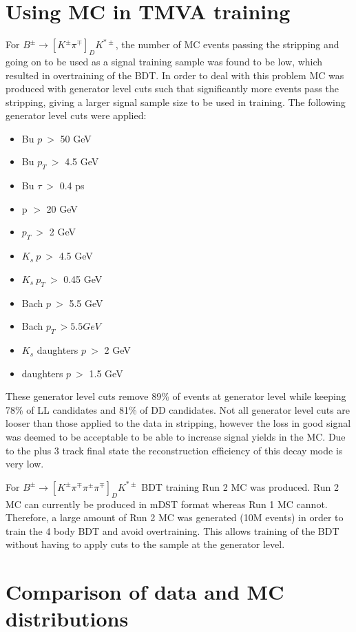 \section{Using MC in TMVA training}
\label{sec:mc:tmva}

For $B^{\pm} \to [K^{\pm}\pi^{\mp}]_D K^{*\pm}$, the number of MC events passing the stripping and going on to be used as a signal training sample was found to be low, which resulted in overtraining of the BDT. In order to deal with this problem MC was produced with generator level cuts such that significantly more events pass the stripping, giving a larger signal sample size to be used in training. The following generator level cuts were applied:

\begin{itemize}
\item{Bu $p\ >$ 50 GeV}
\item{Bu $p_T\ >$ 4.5 GeV}
\item{Bu $\tau\ >$ 0.4 ps}
\item{\Dz p $>$ 20 GeV}
\item{\Dz $p_T\ >$ 2 GeV}
\item{$K_s\ p\ >$ 4.5 GeV}
\item{$K_s\ p_T\ >$ 0.45 GeV}
\item{Bach $p\ >$ 5.5 GeV}
\item{Bach $p_T\ > 5.5 GeV$}
\item{$K_s$ daughters $p\ >$ 2 GeV}
\item{\Dz daughters $p\ >$ 1.5 GeV}
\end{itemize}

These generator level cuts remove 89\% of events at generator level while keeping 78\% of LL candidates and 81\% of DD candidates. Not all generator level cuts are looser than those applied to the data in stripping, however the loss in good signal was deemed to be acceptable to be able to increase signal yields in the MC. Due to the \KS plus 3 track final state the reconstruction efficiency of this decay mode is very low.

For $B^{\pm} \to [K^{\pm}\pi^{\mp}\pi^{\pm}\pi^{\mp}]_D K^{*\pm}$ BDT training Run 2 MC was produced. Run 2 MC can currently be produced in mDST format whereas Run 1 MC cannot. Therefore, a large amount of Run 2 MC was generated (10M events) in order to train the 4 body BDT and avoid overtraining. This allows training of the BDT without having to apply cuts to the sample at the generator level.


\section{Comparison of data and MC distributions}
\label{sec:mc:datavsmc}


